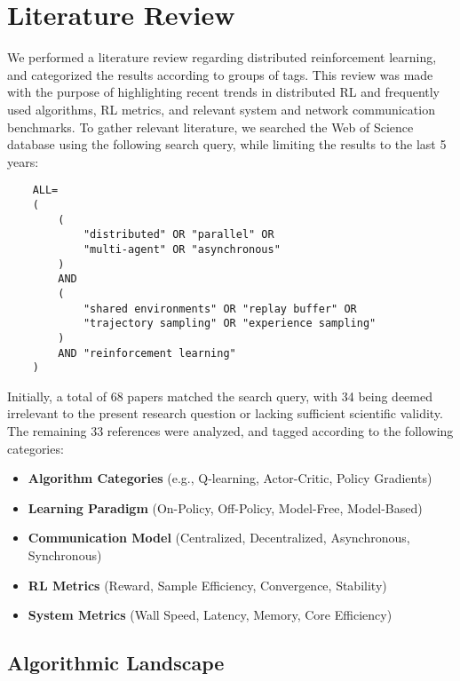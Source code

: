 \chapter{Literature Review}
\label{ch:literature_review}

We performed a literature review regarding distributed reinforcement learning,
and categorized the results according to groups of tags.
This review was made with the purpose of highlighting recent trends in distributed RL and frequently used algorithms, RL metrics,
and relevant system and network communication benchmarks.
To gather relevant literature, we searched the Web of Science database using the following search query,
while limiting the results to the last 5 years:

\begin{verbatim}
    ALL=
    (
        (
            "distributed" OR "parallel" OR
            "multi-agent" OR "asynchronous"
        )
        AND
        (
            "shared environments" OR "replay buffer" OR
            "trajectory sampling" OR "experience sampling"
        )
        AND "reinforcement learning"
    )
\end{verbatim}

Initially, a total of 68 papers matched the search query, with 34 being deemed irrelevant to the
present research question or lacking sufficient scientific validity.
The remaining 33 references were analyzed, and tagged according to the following categories:

\begin{itemize}[leftmargin=*, label={--}]
    \item \textbf{Algorithm Categories} (e.g., Q-learning, Actor-Critic, Policy Gradients)
    \item \textbf{Learning Paradigm} (On-Policy, Off-Policy, Model-Free, Model-Based)
    \item \textbf{Communication Model} (Centralized, Decentralized, Asynchronous, Synchronous)
    \item \textbf{RL Metrics} (Reward, Sample Efficiency, Convergence, Stability)
    \item \textbf{System Metrics} (Wall Speed, Latency, Memory, Core Efficiency)
\end{itemize}

\section{Algorithmic Landscape}
\label{sec:algorithmic-landscape}

